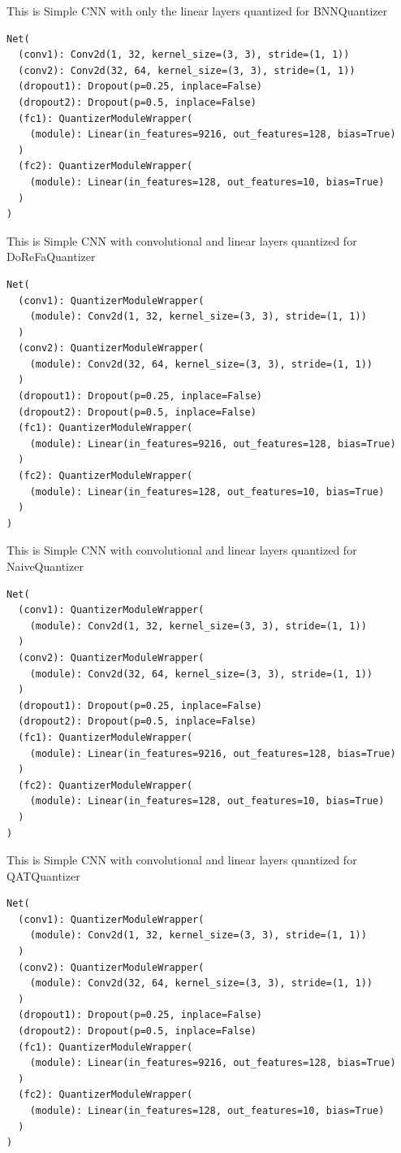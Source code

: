\documentclass{article}
\begin{document}
This is Simple CNN with only the linear layers quantized for BNNQuantizer
\begin{verbatim}
Net(
  (conv1): Conv2d(1, 32, kernel_size=(3, 3), stride=(1, 1))
  (conv2): Conv2d(32, 64, kernel_size=(3, 3), stride=(1, 1))
  (dropout1): Dropout(p=0.25, inplace=False)
  (dropout2): Dropout(p=0.5, inplace=False)
  (fc1): QuantizerModuleWrapper(
    (module): Linear(in_features=9216, out_features=128, bias=True)
  )
  (fc2): QuantizerModuleWrapper(
    (module): Linear(in_features=128, out_features=10, bias=True)
  )
)
\end{verbatim}

This is Simple CNN with convolutional and linear layers quantized for DoReFaQuantizer
\begin{verbatim}
Net(
  (conv1): QuantizerModuleWrapper(
    (module): Conv2d(1, 32, kernel_size=(3, 3), stride=(1, 1))
  )
  (conv2): QuantizerModuleWrapper(
    (module): Conv2d(32, 64, kernel_size=(3, 3), stride=(1, 1))
  )
  (dropout1): Dropout(p=0.25, inplace=False)
  (dropout2): Dropout(p=0.5, inplace=False)
  (fc1): QuantizerModuleWrapper(
    (module): Linear(in_features=9216, out_features=128, bias=True)
  )
  (fc2): QuantizerModuleWrapper(
    (module): Linear(in_features=128, out_features=10, bias=True)
  )
)
\end{verbatim}

This is Simple CNN with convolutional and linear layers quantized for NaiveQuantizer
\begin{verbatim}
Net(
  (conv1): QuantizerModuleWrapper(
    (module): Conv2d(1, 32, kernel_size=(3, 3), stride=(1, 1))
  )
  (conv2): QuantizerModuleWrapper(
    (module): Conv2d(32, 64, kernel_size=(3, 3), stride=(1, 1))
  )
  (dropout1): Dropout(p=0.25, inplace=False)
  (dropout2): Dropout(p=0.5, inplace=False)
  (fc1): QuantizerModuleWrapper(
    (module): Linear(in_features=9216, out_features=128, bias=True)
  )
  (fc2): QuantizerModuleWrapper(
    (module): Linear(in_features=128, out_features=10, bias=True)
  )
)
\end{verbatim}

This is Simple CNN with convolutional and linear layers quantized for QATQuantizer
\begin{verbatim}
Net(
  (conv1): QuantizerModuleWrapper(
    (module): Conv2d(1, 32, kernel_size=(3, 3), stride=(1, 1))
  )
  (conv2): QuantizerModuleWrapper(
    (module): Conv2d(32, 64, kernel_size=(3, 3), stride=(1, 1))
  )
  (dropout1): Dropout(p=0.25, inplace=False)
  (dropout2): Dropout(p=0.5, inplace=False)
  (fc1): QuantizerModuleWrapper(
    (module): Linear(in_features=9216, out_features=128, bias=True)
  )
  (fc2): QuantizerModuleWrapper(
    (module): Linear(in_features=128, out_features=10, bias=True)
  )
)
\end{verbatim}
\end{document}
